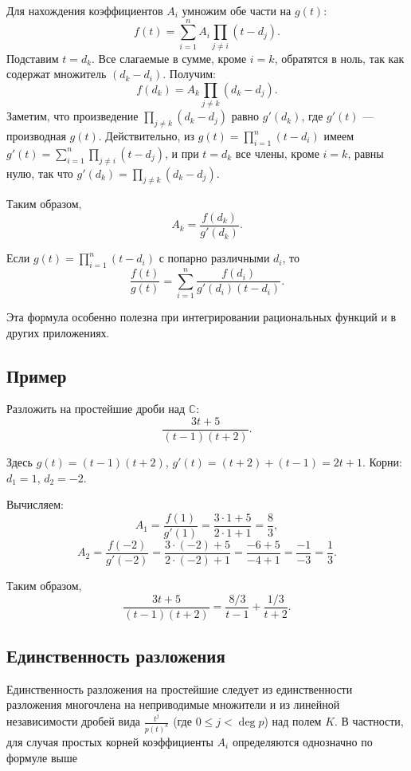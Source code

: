 \documentclass[a4paper,12pt]{article}
\theoremstyle{definition}
\theoremstyle{plain}
\theoremstyle{remark}
\begin{document}
	Для нахождения коэффициентов \( A_i \) умножим обе части на \( g(t) \):
	\[
	f(t) = \sum_{i=1}^n A_i \prod_{j \neq i} (t - d_j).
	\]
	Подставим \( t = d_k \). Все слагаемые в сумме, кроме \( i = k \), обратятся в ноль, так как содержат множитель \( (d_k - d_i) \). Получим:
	\[
	f(d_k) = A_k \prod_{j \neq k} (d_k - d_j).
	\]
	Заметим, что произведение \( \prod_{j \neq k} (d_k - d_j) \) равно \( g'(d_k) \), где \( g'(t) \) — производная \( g(t) \). Действительно, из \( g(t) = \prod_{i=1}^n (t - d_i) \) имеем \( g'(t) = \sum_{i=1}^n \prod_{j \neq i} (t - d_j) \), и при \( t = d_k \) все члены, кроме \( i = k \), равны нулю, так что \( g'(d_k) = \prod_{j \neq k} (d_k - d_j) \).
	
	Таким образом,
	\[
	A_k = \frac{f(d_k)}{g'(d_k)}.
	\]
	
	\begin{tcolorbox}[colback=yellow!5, colframe=orange!50!black, title=Формула для простых корней]
		Если \( g(t) = \prod_{i=1}^n (t - d_i) \) с попарно различными \( d_i \), то
		\[
		\frac{f(t)}{g(t)} = \sum_{i=1}^n \frac{f(d_i)}{g'(d_i)(t - d_i)}.
		\]
	\end{tcolorbox}
	
	Эта формула особенно полезна при интегрировании рациональных функций и в других приложениях.
	
	\subsection{Пример}
	
	Разложить на простейшие дроби над \( \mathbb{C} \):
	\[
	\frac{3t + 5}{(t-1)(t+2)}.
	\]
	
	Здесь \( g(t) = (t-1)(t+2) \), \( g'(t) = (t+2) + (t-1) = 2t + 1 \). Корни: \( d_1 = 1 \), \( d_2 = -2 \).
	
	Вычисляем:
	\[
	A_1 = \frac{f(1)}{g'(1)} = \frac{3 \cdot 1 + 5}{2 \cdot 1 + 1} = \frac{8}{3},
	\]
	\[
	A_2 = \frac{f(-2)}{g'(-2)} = \frac{3 \cdot (-2) + 5}{2 \cdot (-2) + 1} = \frac{-6 + 5}{-4 + 1} = \frac{-1}{-3} = \frac{1}{3}.
	\]
	
	Таким образом,
	\[
	\frac{3t + 5}{(t-1)(t+2)} = \frac{8/3}{t-1} + \frac{1/3}{t+2}.
	\]
	
	\subsection{Единственность разложения}
	
	Единственность разложения на простейшие следует из единственности разложения многочлена на неприводимые множители и из линейной независимости дробей вида \( \frac{t^j}{p(t)^k} \) (где \( 0 \leq j < \deg p \)) над полем \( K \). В частности, для случая простых корней коэффициенты \( A_i \) определяются однозначно по формуле выше
	
\end{document}
